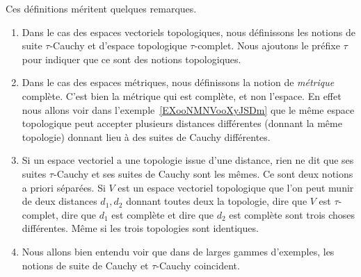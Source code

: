 \begin{normaltext}
    Ces définitions méritent quelques remarques.
    \begin{enumerate}
        \item
            Dans le cas des espaces vectoriels topologiques, nous définissons les notions de suite \( \tau\)-Cauchy et d'espace topologique \( \tau\)-complet. Nous ajoutons le préfixe \( \tau\) pour indiquer que ce sont des notions topologiques.
        \item
            Dans le cas des espaces métriques, nous définissons la notion de \emph{métrique} complète. C'est bien la métrique qui est complète, et non l'espace. En effet nous allons voir dans l'exemple~\ref{EXooNMNVooXyJSDm} que le même espace topologique peut accepter plusieurs distances différentes (donnant la même topologie) donnant lieu à des suites de Cauchy différentes.
        \item
            Si un espace vectoriel a une topologie issue d'une distance, rien ne dit que ses suites \( \tau\)-Cauchy et ses suites de Cauchy sont les mêmes. Ce sont deux notions a priori séparées. Si \( V\) est un espace vectoriel topologique que l'on peut munir de deux distances \( d_1, d_2\) donnant toutes deux la topologie, dire que \( V\) est \( \tau\)-complet, dire que \( d_1\) est complète et dire que \( d_2\) est complète sont trois choses différentes. Même si les trois topologies sont identiques.
        \item
            Nous allons bien entendu voir que dans de larges gammes d'exemples, les notions de suite de Cauchy et \( \tau\)-Cauchy coincident.
    \end{enumerate}
\end{normaltext}

